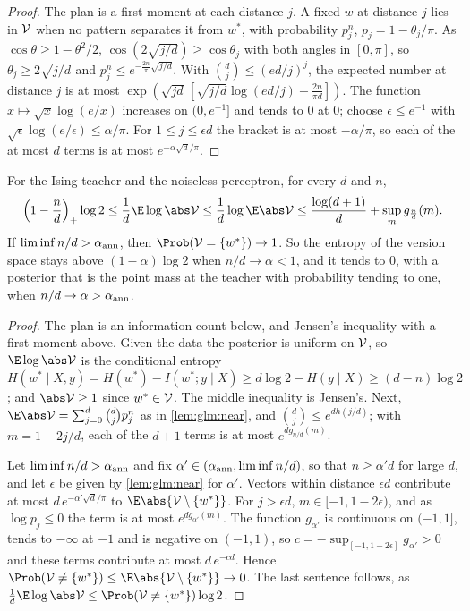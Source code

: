 \begin{refsection}
\begin{proof}
The plan is a first moment at each distance $j$. A fixed $w$ at distance $j$ lies in $\mathcal{V}$ when no pattern separates it from $w^*$, with probability $p_j^n$, $p_j=1-\theta_j/\pi$. As $\cos\theta\ge1-\theta^2/2$, $\cos(2\sqrt{j/d})\ge\cos\theta_j$ with both angles in $[0,\pi]$, so $\theta_j\ge2\sqrt{j/d}$ and $p_j^n\le e^{-\frac{2n}\pi\sqrt{j/d}}$. With $\binom dj\le(ed/j)^j$, the expected number at distance $j$ is at most $\exp(\sqrt{jd}\,[\sqrt{j/d}\log(ed/j)-\frac{2n}{\pi d}])$. The function $x\mapsto\sqrt x\log(e/x)$ increases on $(0,e^{-1}]$ and tends to $0$ at $0$; choose $\epsilon\le e^{-1}$ with $\sqrt\epsilon\log(e/\epsilon)\le\alpha/\pi$. For $1\le j\le\epsilon d$ the bracket is at most $-\alpha/\pi$, so each of the at most $d$ terms is at most $e^{-\alpha\sqrt d/\pi}$.
\end{proof}

\begin{theorem}\label{thm:glm:versionspace}
For the Ising teacher and the noiseless perceptron, for every $d$ and $n$,
\begin{equation}\label{eq:glm:vsbounds}
\Bigl(1-\frac nd\Bigr)_+\log2\le\frac1d\E\log\abs\glmV\le\frac1d\log\E\abs\glmV\le\frac{\log(d+1)}d+\sup_{m}g_{\frac nd}(m).
\end{equation}
If $\liminf n/d>\alpha_{\mathrm{ann}}$, then $\Prob(\glmV=\{w^*\})\to1$. So the entropy of the version space stays above $(1-\alpha)\log2$ when $n/d\to\alpha<1$, and it tends to $0$, with a posterior that is the point mass at the teacher with probability tending to one, when $n/d\to\alpha>\alpha_{\mathrm{ann}}$.
\end{theorem}

\begin{proof}
The plan is an information count below, and Jensen's inequality with a first moment above. Given the data the posterior is uniform on $\mathcal{V}$, so $\E\log\abs\glmV$ is the conditional entropy $H(w^*\mid X,y)=H(w^*)-I(w^*;y\mid X)\ge d\log2-H(y\mid X)\ge(d-n)\log2$; and $\abs\glmV\ge1$ since $w^*\in\mathcal{V}$. The middle inequality is Jensen's. Next, $\E\abs\glmV=\sum_{j=0}^d\binom djp_j^n$ as in \cref{lem:glm:near}, and $\binom dj\le e^{dh(j/d)}$; with $m=1-2j/d$, each of the $d+1$ terms is at most $e^{dg_{n/d}(m)}$.

Let $\liminf n/d>\alpha_{\mathrm{ann}}$ and fix $\alpha'\in(\alpha_{\mathrm{ann}},\liminf n/d)$, so that $n\ge\alpha'd$ for large $d$, and let $\epsilon$ be given by \cref{lem:glm:near} for $\alpha'$. Vectors within distance $\epsilon d$ contribute at most $d\,e^{-\alpha'\sqrt d/\pi}$ to $\E\abs{\glmV\setminus\{w^*\}}$. For $j>\epsilon d$, $m\in[-1,1-2\epsilon)$, and as $\log p_j\le0$ the term is at most $e^{dg_{\alpha'}(m)}$. The function $g_{\alpha'}$ is continuous on $(-1,1]$, tends to $-\infty$ at $-1$ and is negative on $(-1,1)$, so $c=-\sup_{[-1,1-2\epsilon]}g_{\alpha'}>0$ and these terms contribute at most $d\,e^{-cd}$. Hence $\Prob(\glmV\ne\{w^*\})\le\E\abs{\glmV\setminus\{w^*\}}\to0$. The last sentence follows, as $\frac1d\E\log\abs\glmV\le\Prob(\glmV\ne\{w^*\})\log2$.
\end{proof}


\end{refsection}
